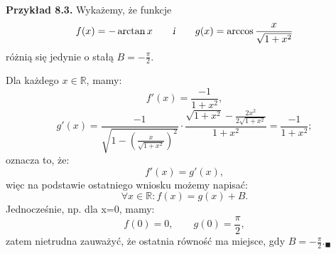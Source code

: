 \documentclass[a4paper,12pt]{article}
\begin{document}
	\textbf{Przykład 8.3.} Wykażemy, że funkcje
	$$
	f(x) = -\arctan x\qquad \textsl{i}  \qquad g(x) = \arccos \frac{x}{\sqrt{1+x^2}}$$
	różnią się jedynie o stałą $B = -\frac{\pi}{2}$.
	
	\vspace{0.25cm}
	Dla każdego $x \in \mathbb{R}$, mamy:
	$$
	f'(x) = \frac{-1}{1+x^2},
	$$
	$$
	g'(x) = \frac{-1}{\sqrt{1-\left ( \frac{x}{\sqrt{1+ x^2}}
	\right )^2 }} \cdot
	\frac{\sqrt{1+x^2}-\frac{2x^2}{2\sqrt{1+x^2}}}{1+x^2}
	=
	\frac{-1}{1+x^2};
	$$
	oznacza to, że: 
	$$f'(x) = g'(x),$$
	więc na podstawie ostatniego wniosku możemy napisać:
	$$\forall x \in \mathbb{R}: f(x) = g(x) + B.$$
	Jednocześnie, np. dla x=0, mamy:
	$$f(0) = 0, \qquad g(0)=\frac{\pi}{2},$$
	zatem nietrudna zauważyć, że ostatnia równość ma miejsce, gdy $B = - \frac{\pi}{2}._{\blacksquare}$
\end{document}
